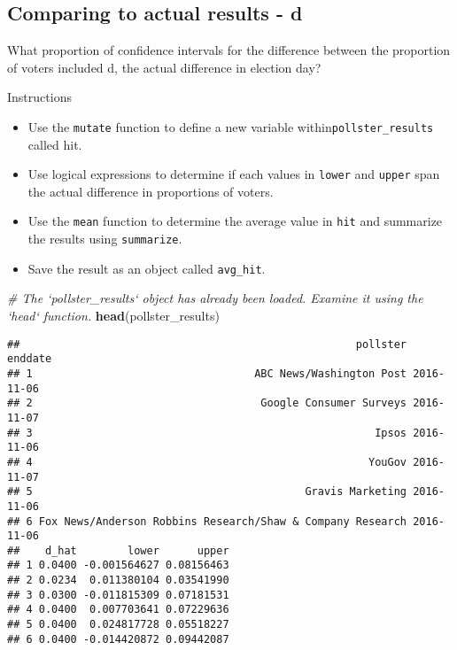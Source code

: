 \documentclass[]{article}
\newenvironment{Shaded}{\begin{snugshade}}{\end{snugshade}}
\newcommand{\KeywordTok}[1]{\textcolor[rgb]{0.13,0.29,0.53}{\textbf{#1}}}
\newcommand{\CommentTok}[1]{\textcolor[rgb]{0.56,0.35,0.01}{\textit{#1}}}
\newcommand{\NormalTok}[1]{#1}
\providecommand{\tightlist}{%
  \setlength{\itemsep}{0pt}\setlength{\parskip}{0pt}}
\begin{document}
\subsection{\texorpdfstring{\textbf{Comparing to actual results -
d}}{Comparing to actual results - d}}\label{comparing-to-actual-results---d}

What proportion of confidence intervals for the difference between the
proportion of voters included d, the actual difference in election day?

Instructions

\begin{itemize}
\tightlist
\item
  Use the \texttt{mutate} function to define a new variable
  within\texttt{pollster\_results} called hit.
\item
  Use logical expressions to determine if each values in \texttt{lower}
  and \texttt{upper} span the actual difference in proportions of
  voters.
\item
  Use the \texttt{mean} function to determine the average value in
  \texttt{hit} and summarize the results using \texttt{summarize}.
\item
  Save the result as an object called \texttt{avg\_hit}.
\end{itemize}

\begin{Shaded}
\begin{Highlighting}[]
\CommentTok{# The `pollster_results` object has already been loaded. Examine it using the `head` function.}
\KeywordTok{head}\NormalTok{(pollster_results)}
\end{Highlighting}
\end{Shaded}

\begin{verbatim}
##                                                     pollster    enddate
## 1                                   ABC News/Washington Post 2016-11-06
## 2                                    Google Consumer Surveys 2016-11-07
## 3                                                      Ipsos 2016-11-06
## 4                                                     YouGov 2016-11-07
## 5                                           Gravis Marketing 2016-11-06
## 6 Fox News/Anderson Robbins Research/Shaw & Company Research 2016-11-06
##    d_hat        lower      upper
## 1 0.0400 -0.001564627 0.08156463
## 2 0.0234  0.011380104 0.03541990
## 3 0.0300 -0.011815309 0.07181531
## 4 0.0400  0.007703641 0.07229636
## 5 0.0400  0.024817728 0.05518227
## 6 0.0400 -0.014420872 0.09442087
\end{verbatim}
\end{document}
